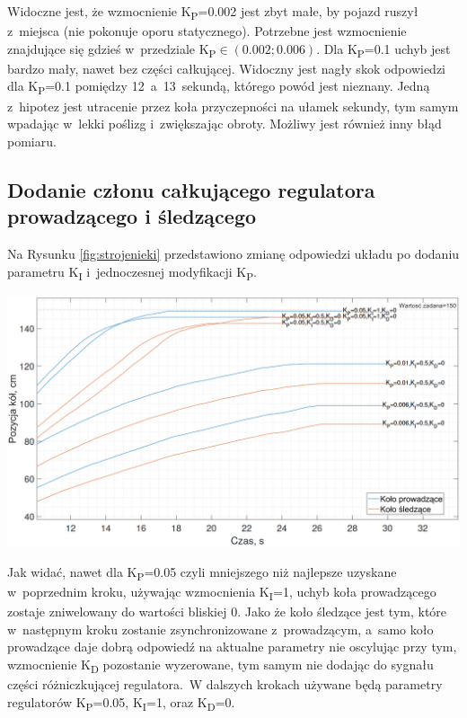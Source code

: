 Widoczne jest, że wzmocnienie K\textsubscript{P}=0.002 jest zbyt małe, by pojazd ruszył z~miejsca (nie pokonuje oporu statycznego). Potrzebne jest wzmocnienie znajdujące się gdzieś w~przedziale K\textsubscript{P}$\in \left(0.002;0.006\right)$. Dla K\textsubscript{P}=0.1 uchyb jest bardzo mały, nawet bez części całkującej. Widoczny jest nagły skok odpowiedzi dla K\textsubscript{P}=0.1 pomiędzy 12~a~13~sekundą, którego powód jest nieznany. Jedną z~hipotez jest utracenie przez koła przyczepności na ułamek sekundy, tym samym wpadając w~lekki poślizg i~zwiększając obroty. Możliwy jest również inny błąd pomiaru.

\subsection*{Dodanie członu całkującego regulatora prowadzącego i śledzącego}
Na Rysunku \ref{fig:strojenieki} przedstawiono zmianę odpowiedzi układu po dodaniu parametru K\textsubscript{I} i~jednoczesnej modyfikacji K\textsubscript{P}.
\begin{center}
    \includegraphics[scale=0.4]{images/strojenieKi.png}
    \label{fig:strojenieki}
\end{center}

Jak widać, nawet dla K\textsubscript{P}=0.05 czyli mniejszego niż najlepsze uzyskane w~poprzednim kroku, używając wzmocnienia K\textsubscript{I}=1, uchyb koła prowadzącego zostaje zniwelowany do wartości bliskiej 0. Jako że koło śledzące jest tym, które w~następnym kroku zostanie zsynchronizowane z~prowadzącym, a~samo koło prowadzące daje dobrą odpowiedź na aktualne parametry nie oscylując przy tym, wzmocnienie K\textsubscript{D} pozostanie wyzerowane, tym samym nie dodając do sygnału części różniczkującej regulatora.~W dalszych krokach używane będą parametry regulatorów K\textsubscript{P}=0.05, K\textsubscript{I}=1, oraz K\textsubscript{D}=0.

